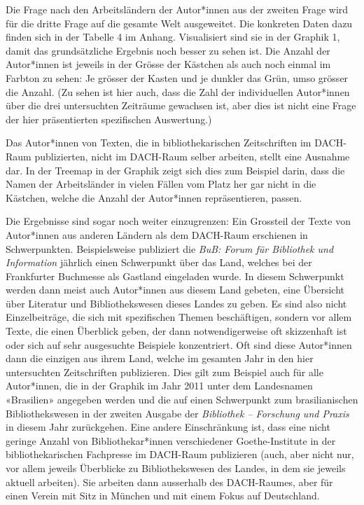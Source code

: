 \documentclass[a4paper,
fontsize=11pt,
oneside,
numbers=noperiodatend,
parskip=half-,
bibliography=totoc,
final
]{scrartcl}
\begin{document}
Die Frage nach den Arbeitsländern der Autor*innen aus der zweiten Frage
wird für die dritte Frage auf die gesamte Welt ausgeweitet. Die
konkreten Daten dazu finden sich in der Tabelle 4 im Anhang.
Visualisiert sind sie in der Graphik 1, damit das grundsätzliche
Ergebnis noch besser zu sehen ist. Die Anzahl der Autor*innen ist
jeweils in der Grösse der Kästchen als auch noch einmal im Farbton zu
sehen: Je grösser der Kasten und je dunkler das Grün, umso grösser die
Anzahl. (Zu sehen ist hier auch, dass die Zahl der individuellen
Autor*innen über die drei untersuchten Zeiträume gewachsen ist, aber
dies ist nicht eine Frage der hier präsentierten spezifischen
Auswertung.)

Das Autor*innen von Texten, die in bibliothekarischen Zeitschriften im
DACH-Raum publizierten, nicht im DACH-Raum selber arbeiten, stellt eine
Ausnahme dar. In der Treemap in der Graphik zeigt sich dies zum Beispiel
darin, dass die Namen der Arbeitsländer in vielen Fällen vom Platz her
gar nicht in die Kästchen, welche die Anzahl der Autor*innen
repräsentieren, passen.

Die Ergebnisse sind sogar noch weiter einzugrenzen: Ein Grossteil der
Texte von Autor*innen aus anderen Ländern als dem DACH-Raum erschienen
in Schwerpunkten. Beispielsweise publiziert die \emph{BuB: Forum für
Bibliothek und Information} jährlich einen Schwerpunkt über das Land,
welches bei der Frankfurter Buchmesse als Gastland eingeladen wurde. In
diesem Schwerpunkt werden dann meist auch Autor*innen aus diesem Land
gebeten, eine Übersicht über Literatur und Bibliothekswesen dieses
Landes zu geben. Es sind also nicht Einzelbeiträge, die sich mit
spezifischen Themen beschäftigen, sondern vor allem Texte, die einen
Überblick geben, der dann notwendigerweise oft skizzenhaft ist oder sich
auf sehr ausgesuchte Beispiele konzentriert. Oft sind diese Autor*innen
dann die einzigen aus ihrem Land, welche im gesamten Jahr in den hier
untersuchten Zeitschriften publizieren. Dies gilt zum Beispiel auch für
alle Autor*innen, die in der Graphik im Jahr 2011 unter dem Landesnamen
«Brasilien» angegeben werden und die auf einen Schwerpunkt zum
brasilianischen Bibliothekswesen in der zweiten Ausgabe der
\emph{Bibliothek -- Forschung und Praxis} in diesem Jahr zurückgehen.
Eine andere Einschränkung ist, dass eine nicht geringe Anzahl von
Bibliothekar*innen verschiedener Goethe-Institute in der
bibliothekarischen Fachpresse im DACH-Raum publizieren (auch, aber nicht
nur, vor allem jeweils Überblicke zu Bibliothekswesen des Landes, in dem
sie jeweils aktuell arbeiten). Sie arbeiten dann ausserhalb des
DACH-Raumes, aber für einen Verein mit Sitz in München und mit einem
Fokus auf Deutschland.
\end{document}

